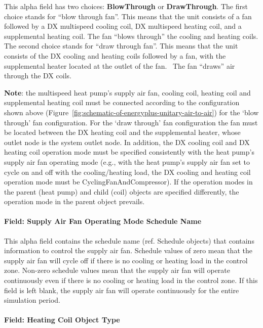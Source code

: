 This alpha field has two choices: \textbf{BlowThrough} or \textbf{DrawThrough}. The first choice stands for ``blow through fan''. This means that the unit consists of a fan followed by a DX multispeed cooling coil, DX multispeed heating coil, and a supplemental heating coil. The fan ``blows through'' the cooling and heating coils. The second choice stands for ``draw through fan''. This means that the unit consists of the DX cooling and heating coils followed by a fan, with the supplemental heater located at the outlet of the fan.~ The fan ``draws'' air through the DX coils.

\textbf{Note}: the multispeed heat pump's supply air fan, cooling coil, heating coil and supplemental heating coil must be connected according to the configuration shown above (Figure~\ref{fig:schematic-of-energyplus-unitary-air-to-air}) for the `blow through' fan configuration. For the `draw through' fan configuration the fan must be located between the DX heating coil and the supplemental heater, whose outlet node is the system outlet node. In addition, the DX cooling coil and DX heating coil operation mode must be specified consistently with the heat pump's supply air fan operating mode (e.g., with the heat pump's supply air fan set to cycle on and off with the cooling/heating load, the DX cooling and heating coil operation mode must be CyclingFanAndCompressor). If the operation modes in the parent (heat pump) and child (coil) objects are specified differently, the operation mode in the parent object prevails.

\paragraph{Field: Supply Air Fan Operating Mode Schedule Name}\label{field-supply-air-fan-operating-mode-schedule-name-1}

This alpha field contains the schedule name (ref. Schedule objects) that contains information to control the supply air fan. Schedule values of zero mean that the supply air fan will cycle off if there is no cooling or heating load in the control zone. Non-zero schedule values mean that the supply air fan will operate continuously even if there is no cooling or heating load in the control zone. If this field is left blank, the supply air fan will operate continuously for the entire simulation period.

\paragraph{Field: Heating Coil Object Type}\label{field-heating-coil-object-type-4}

